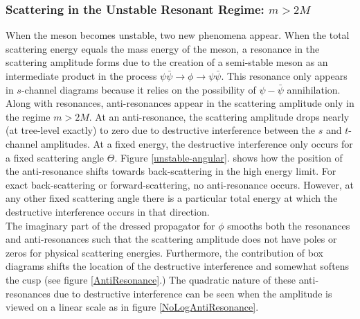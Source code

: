 \documentclass[12pt]{extarticle}
\begin{document}
\subsubsection{Scattering in the Unstable Resonant Regime: $m > 2 M$}
When the meson becomes unstable, two new phenomena appear. When the total scattering energy equals the mass energy of the meson, a resonance in the scattering amplitude forms due to the creation of a semi-stable meson as an intermediate product in the process $\psi \bar{\psi} \to \phi \to \psi \bar{\psi}$. This resonance only appears in $s$-channel diagrams because it relies on the possibility of $\psi-\bar{\psi}$ annihilation. Along with resonances, anti-resonances appear in the scattering amplitude only in the regime $m > 2 M$. At an anti-resonance, the scattering amplitude drops nearly (at tree-level exactly) to zero due to destructive interference between the $s$ and $t$-channel amplitudes. At a fixed energy, the destructive interference only occurs for a fixed scattering angle $\Theta$. Figure \ref{unstable-angular}. shows how the position of the anti-resonance shifts towards back-scattering in the high energy limit. For exact back-scattering or forward-scattering, no anti-resonance occurs. However, at any other fixed scattering angle there is a particular total energy at which the destructive interference occurs in that direction.\bigskip\\
The imaginary part of the dressed propagator for $\phi$ smooths both the resonances and anti-resonances such that the scattering amplitude does not have poles or zeros for physical scattering energies. Furthermore, the contribution of box diagrams shifts the location of the destructive interference and somewhat softens the cusp (see figure \ref{AntiResonance}.) The quadratic nature of these anti-resonances due to destructive interference can be seen when the amplitude is viewed on a linear scale as in figure \ref{NoLogAntiResonance}.    
\end{document}
